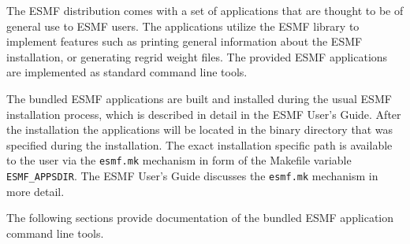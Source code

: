 The ESMF distribution comes with a set of applications that are thought to be
of general use to ESMF users. The applications utilize the ESMF library to
implement features such as printing general information about the ESMF
installation, or generating regrid weight files. The provided ESMF applications
are implemented as standard command line tools.

The bundled ESMF applications are built and installed during the usual ESMF
installation process, which is described in detail in the ESMF User's Guide. 
After the installation the applications will be located in the binary directory
that was specified during the installation. The exact installation specific
path is available to the user via the {\tt esmf.mk} mechanism in form of the
Makefile variable {\tt ESMF\_APPSDIR}. The ESMF User's Guide discusses the
{\tt esmf.mk} mechanism in more detail.

The following sections provide documentation of the bundled ESMF application command line tools.

